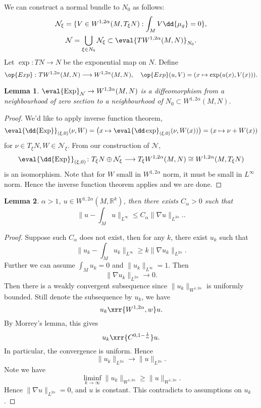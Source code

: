 \documentclass[UTF8,12pt]{article}
\theoremstyle{plain}\newtheorem{theorem}{Theorem}
\theoremstyle{definition}\newtheorem{definition}[theorem]{Definition}
\theoremstyle{definition}\newtheorem{example}[theorem]{Example}
\theoremstyle{plain}\newtheorem{axiom}[theorem]{Axiom}
\theoremstyle{plain}\newtheorem{assertion}[theorem]{Assertion}
\theoremstyle{plain}\newtheorem{corollary}[theorem]{Corollary}
\theoremstyle{plain}\newtheorem{lemma}[theorem]{Lemma}
\theoremstyle{plain}\newtheorem{proposition}[theorem]{Proposition}
\theoremstyle{plain}\newtheorem{prop}[theorem]{Proposition}
\theoremstyle{plain}\newtheorem{conjecture}[theorem]{Conjecture}
\theoremstyle{plain}\newtheorem{conj}[theorem]{Conjecture}
\theoremstyle{plain}\newtheorem{problem}[theorem]{Problem}
\theoremstyle{remark}\newtheorem{notation}[theorem]{Notation}
\theoremstyle{definition}\newtheorem*{question}{Question}
\theoremstyle{definition}\newtheorem*{answer}{Answer}
\theoremstyle{definition}\newtheorem*{goal}{Goal}
\theoremstyle{plain}\newtheorem*{application}{Application}
\theoremstyle{plain}\newtheorem*{exercise}{Exercise}
\theoremstyle{remark}\newtheorem*{remark}{Remark}
\theoremstyle{remark}\newtheorem*{note}{\small{Note}}
\numberwithin{equation}{section}
\numberwithin{theorem}{section}
\numberwithin{figure}{section}
\DeclareMathOperator{\Exp}{Exp}
\begin{document}
We can construct a normal bundle to \(N_0\) as follows:
\begin{gather*}
    \mathcal{N}_\xi=\{V\in W^{1,2\alpha}(M,T_\xi N):\int_{M}V\dd{\mu_g}=0\}, \\
    \mathcal{N}=\bigcup_{\xi\in N_0}\mathcal{N}_\xi\subset
    \eval{TW^{1,2\alpha}(M,N)}_{N_0}.
\end{gather*}
Let \(\exp\colon TN\to N\) be the exponential map on \(N\). Define \[
    \op{Exp}\,\colon TW^{1,2\alpha}(M,N)\longrightarrow W^{1,2\alpha}(M,N),\quad
    \op{Exp}(u,V)=(x\mapsto \exp(u(x),V(x)))
.\] 
\begin{lemma}
    \(\eval{\Exp}_{\mathcal{N}}\to W^{1,2\alpha}(M,N)\) is a diffeomorphism from
    a neighbourhood of zero section to a neighbourhood of \(N_0\subset
    W^{1,2\alpha}(M,N)\).
\end{lemma}
\begin{proof}
    We'd like to apply inverse function theorem, \[
        \eval{\dd{\Exp}}_{(\xi,0)}(\nu,W)
        =\big(x\mapsto\eval{\dd\exp}_{(\xi,0)}(\nu,W(x))\big)
        =(x\mapsto \nu+W(x))
    \] for \(\nu\in T_\xi N,W\in \mathcal{N}_\xi\). From our construction of
    \(\mathcal{N}\), \[
        \eval{\dd{\Exp}}_{(\xi,0)}\colon T_\xi N\oplus\mathcal{N}_\xi
        \longrightarrow T_\xi W^{1,2\alpha}(M,N)\cong W^{1,2\alpha}(M,T_\xi N)
    \] is an isomorphism. Note that for \(W\) small in \(W^{1,2\alpha}\) norm,
    it must be small in \(L^\infty\) norm. Hence the inverse function theorem applies
    and we are done.
\end{proof}
\begin{lemma}
    \(\alpha>1\), \(u\in W^{1,2\alpha}(M,\mathbb{R}^k)\), then there exists
    \(C_\alpha>0\) such that \[
        \|u-\int_M u\|_{L^\infty}\le C_\alpha \|\nabla u\|_{L^{2\alpha}}.
    .\]
\end{lemma}
\begin{proof}
    Suppose such \(C_\alpha\) does not exist, then for any \(k\), there exist \(u_k\)
    such that \[
        \|u_k-\int_{M}u_k\|_{L^\infty}\ge k \|\nabla u_k\|_{L^{2\alpha}}
    .\] Further we can assume \(\int_{M}u_k=0\) and \(\|u_k\|_{L^\infty}=1\).
    Then \[
        \|\nabla u_k\|_{L^{2\alpha}}\longrightarrow 0
    .\] Then there is a weakly convergent subsequence since \(\|u_k\|_{W^{1,2\alpha}}\)
    is uniformly bounded. Still denote the subsequence by \(u_k\), we have \[
        u_k\xrr{W^{1,2\alpha},w}u
    .\] By Morrey's lemma, this gives \[
        u_k\xrr{C^{0,1-\frac{1}{\alpha}}}u
    .\] In particular, the convergence is uniform. Hence  \[
        \|u_k\|_{L^{2\alpha}}\longrightarrow \|u\|_{L^{2\alpha}}
    .\] Note we have \[
        \liminf_{k\to \infty}\|u_k\|_{W^{1,2\alpha}}\ge \|u\|_{W^{1,2\alpha}}
    .\] Hence \(\|\nabla u\|_{L^{2\alpha}}=0\), and \(u\) is constant.
    This contradicts to assumptions on \(u_k\). 
\end{proof}
\end{document}
